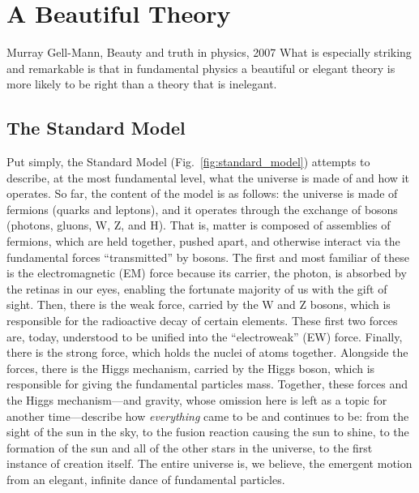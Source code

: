 \chapter{A Beautiful Theory}
\begin{aquote}{Murray Gell-Mann, Beauty and truth in physics, 2007}
    What is especially striking and remarkable is that in fundamental physics 
    a beautiful or elegant theory is more likely to be right 
    than a theory that is inelegant.
\end{aquote}

\section{The Standard Model}
Put simply, the Standard Model (Fig.~\ref{fig:standard_model}) attempts to describe, at the most fundamental level, what the universe is made of and how it operates. 
So far, the content of the model is as follows: the universe is made of fermions (quarks and leptons), and it operates through the exchange of bosons (photons, gluons, W, Z, and H). 
That is, matter\footnotemark{} is composed of assemblies of fermions, which are held together, pushed apart, and otherwise interact via the fundamental forces ``transmitted'' by bosons. 
The first and most familiar of these is the electromagnetic (EM) force because its carrier, the photon, is absorbed by the retinas in our eyes, enabling the fortunate majority of us with the gift of sight. 
Then, there is the weak force, carried by the W and Z bosons, which is responsible for the radioactive decay of certain elements. 
These first two forces are, today, understood to be unified into the ``electroweak'' (EW) force. 
Finally, there is the strong force, which holds the nuclei of atoms together. 
Alongside the forces, there is the Higgs mechanism, carried by the Higgs boson, which is responsible for giving the fundamental particles mass. 
Together, these forces and the Higgs mechanism---and gravity, whose omission here is left as a topic for another time---describe how \textit{everything} came to be and continues to be: from the sight of the sun in the sky, to the fusion reaction causing the sun to shine, to the formation of the sun and all of the other stars in the universe, to the first instance of creation itself. 
The entire universe is, we believe, the emergent motion from an elegant, infinite dance of fundamental particles. 

